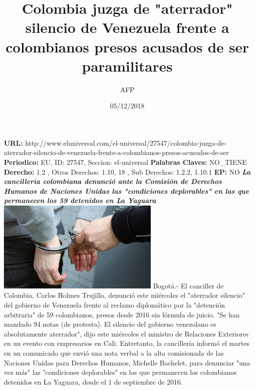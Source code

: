 \documentclass{article}%
\title{\textbf{Colombia juzga de "aterrador" silencio de Venezuela frente a colombianos presos acusados de ser paramilitares}}%
\author{AFP}%
\date{05/12/2018}%
\begin{document}
%
\normalsize%
\maketitle%
\textbf{URL: }%
http://www.eluniversal.com/el{-}universal/27547/colombia{-}juzga{-}de{-}aterrador{-}silencio{-}de{-}venezuela{-}frente{-}a{-}colombianos{-}presos{-}acusados{-}de{-}ser\newline%
%
\textbf{Periodico: }%
EU, %
ID: %
27547, %
Seccion: %
el{-}universal\newline%
%
\textbf{Palabras Claves: }%
NO\_TIENE\newline%
%
\textbf{Derecho: }%
1.2%
, Otros Derechos: %
1.10, 18%
, Sub Derechos: %
1.2.2, 1.10.1%
\newline%
%
\textbf{EP: }%
NO\newline%
\newline%
%
\textbf{\textit{La cancillería colombiana denunció ante la Comisión de Derechos Humanos de Naciones Unidas las "condiciones deplorables" en las que permanecen los 59 detenidos en La Yaguara}}%
\newline%
\newline%
%
\includegraphics[width=300px]{223.jpg}%
\newline%
%
Bogotá.{-} El canciller de Colombia, Carlos Holmes Trujillo, denunció este miércoles el "aterrador silencio" del gobierno de Venezuela frente al reclamo diplomático por la "detención arbitraria" de 59 colombianos, presos desde 2016 sin fórmula de juicio.%
\newline%
%
"Se han mandado 94 notas (de protesta). El silencio del gobierno venezolano es absolutamente aterrador", dijo este miércoles el ministro de Relaciones Exteriores en un evento con empresarios en Cali.%
\newline%
%
Entretanto, la cancillería informó el martes en un comunicado que envió una nota verbal a la alta comisionada de las Naciones Unidas para Derechos Humanos, Michelle Bachelet, para denunciar "una vez más" las "condiciones deplorables" en las que permanecen los colombianos detenidos en La Yaguara, desde el 1 de septiembre de 2016.%
\end{document}
